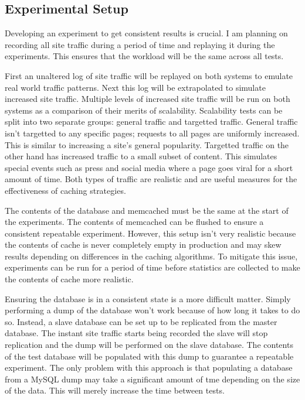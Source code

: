 \documentclass[12pt]{ucthesis}
\begin{document}
\subsection{Experimental Setup}
Developing an experiment to get consistent results is crucial.
I am planning on recording all site traffic during a period of time and replaying it during the experiments.
This ensures that the workload will be the same across all tests.

First an unaltered log of site traffic will be replayed on both systems to emulate real world traffic patterns.
Next this log will be extrapolated to simulate increased site traffic.
Multiple levels of increased site traffic will be run on both systems as a comparison of their merits of scalability.
Scalability tests can be split into two separate groups: general traffic and targetted traffic.
General traffic isn't targetted to any specific pages; requests to all pages are uniformly increased.
This is similar to increasing a site's general popularity.
Targetted traffic on the other hand has increased traffic to a small subset of content.
This simulates special events such as press and social media where a page goes viral for a short amount of time.
Both types of traffic are realistic and are useful measures for the effectiveness of caching strategies.

The contents of the database and memcached must be the same at the start of the experiments.
The contents of memcached can be flushed to ensure a consistent repeatable experiment.
However, this setup isn't very realistic because the contents of cache is never completely empty in production and may skew results depending on differences in the caching algorithms.
To mitigate this issue, experiments can be run for a period of time before statistics are collected to make the contents of cache more realistic.

Ensuring the database is in a consistent state is a more difficult matter.
Simply performing a dump of the database won't work because of how long it takes to do so.
Instead, a slave database can be set up to be replicated from the master database.
The instant site traffic starts being recorded the slave will stop replication and the dump will be performed on the slave database.
The contents of the test database will be populated with this dump to guarantee a repeatable experiment.
The only problem with this approach is that populating a database from a MySQL dump may take a significant amount of tme depending on the size of the data.
This will merely increase the time between tests.
\end{document}
